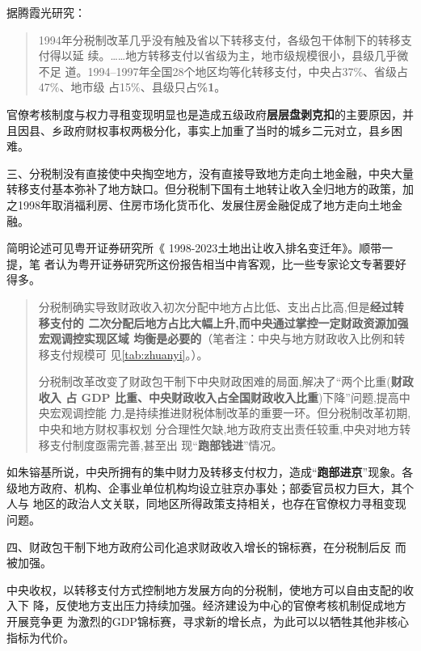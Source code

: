 据腾霞光研究：
\begin{quotation}
  1994年分税制改革几乎没有触及省以下转移支付，各级包干体制下的转移支付得以延
  续。……地方转移支付以省级为主，地市级规模很小，县级几乎微不足
  道。1994--1997年全国28个地区均等化转移支付，中央占37\%、省级占47\%、地市级
  占15\%、县级只占\textbf{\%1}。
\end{quotation}

官僚考核制度与权力寻租变现明显也是造成五级政府\textbf{层层盘剥克扣}的主要原因，并
且因县、乡政府财权事权两极分化，事实上加重了当时的城乡二元对立，县乡困难。


{\heiti 三、分税制没有直接使中央掏空地方，没有直接导致地方走向土地金融，中央大量
  转移支付基本弥补了地方缺口。但分税制下国有土地转让收入全归地方的政策，加
  之1998年取消福利房、住房市场化货币化、发展住房金融促成了地方走向土地金融。}

简明论述可见粤开证券研究所《 1998-2023土地出让收入排名变迁年》。顺带一提，笔
者认为粤开证券研究所这份报告相当中肯客观，比一些专家论文专著要好得多。
\begin{quotation}
  分税制确实导致财政收入初次分配中地方占比低、支出占比高,但是\textbf{经过转移支付的
    二次分配后地方占比大幅上升,而中央通过掌控一定财政资源加强宏观调控实现区域
    均衡是必要的}（笔者注：中央与地方财政收入比例和转移支付规模可
  见\cref{tab:zhuanyi}。）。

  分税制改革改变了财政包干制下中央财政困难的局面,解决了“两个比重(\textbf{财政收入
  占 GDP 比重、中央财政收入占全国财政收入比重})下降”问题,提高中央宏观调控能
  力,是持续推进财税体制改革的重要一环。但分税制改革初期,中央和地方财权事权划
  分合理性欠缺,地方政府支出责任较重,中央对地方转移支付制度亟需完善,甚至出
  现“\textbf{跑部钱进}”情况。
\end{quotation}

如朱镕基所说，中央所拥有的集中财力及转移支付权力，造成“\textbf{跑部进京}”现象。各
级地方政府、机构、企事业单位机构均设立驻京办事处；部委官员权力巨大，其个人与
地区的政治人文关联，同地区所得政策支持相关，也存在官僚权力寻租变现问题。


{\heiti 四、财政包干制下地方政府公司化追求财政收入增长的锦标赛，在分税制后反
  而被加强\cite{yangdi}。}

中央收权，以转移支付方式控制地方发展方向的分税制，使地方可以自由支配的收入下
降，反使地方支出压力持续加强。经济建设为中心的官僚考核机制促成地方开展竞争更
为激烈的GDP锦标赛，寻求新的增长点，为此可以以牺牲其他非核心指标为代价。

